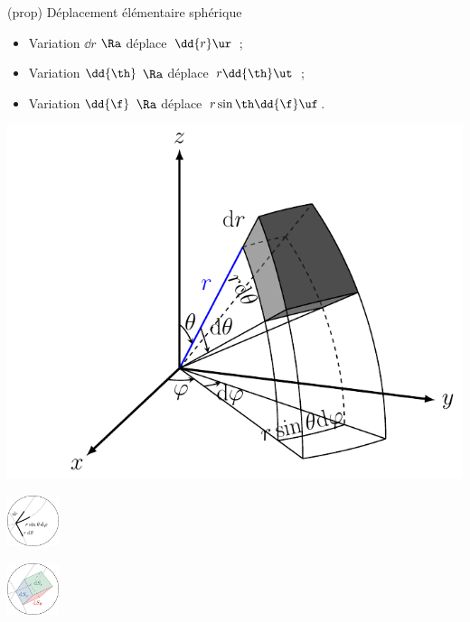 \documentclass[../../main/main.tex]{subfiles}
\begin{document}
\begin{tcb*}[sidebyside, righthand ratio=.5](prop)
	{Déplacement élémentaire sphérique}
	\begin{itemize}
		\item Variation $\dd{r}$ $\Ra$ déplace\mnt\ $\dd{r}\ur$~;
		\item Variation $\dd{\th}$ $\Ra$ déplace\mnt\ $r\dd{\th}\ut$~;
		\item Variation $\dd{\f}$ $\Ra$ déplace\mnt\ $r\sin\th\dd{\f}\uf$.
	\end{itemize}
	\psw{\[\boxed{\dd\OM = \dd{r}\ur + r\dd{\th}\ut + r\sin\th\dd{\f}\uf}\]}
	\tcblower
	\noindent
	\begin{minipage}{.59\linewidth}
		\begin{center}
			\includegraphics[width=\linewidth]{sphe_vol}
			\captionsetup{justification=centering}
		\end{center}
	\end{minipage}
	\begin{minipage}{.39\linewidth}
		\begin{center}
			\includegraphics[height=1.5cm]{zoom_sph_lgn}
		\end{center}
		\begin{center}
			\includegraphics[height=1.5cm]{zoom_sph_sfc}
			\captionsetup{justification=centering}
		\end{center}
	\end{minipage}
\end{tcb*}
\end{document}
